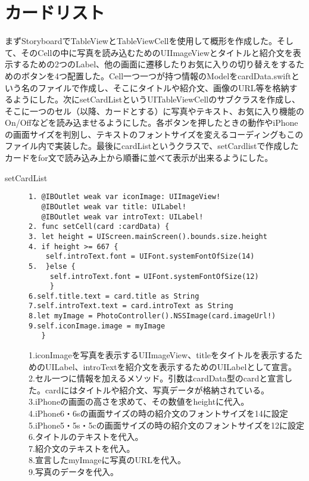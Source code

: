 \section{カードリスト}
まずStoryboardでTableViewとTableViewCellを使用して概形を作成した。そして、そのCellの中に写真を読み込むためのUIImageViewとタイトルと紹介文を表示するための2つのLabel、他の画面に遷移したりお気に入りの切り替えをするためのボタンを4つ配置した。Cell一つ一つが持つ情報のModelをcardData.swiftという名のファイルで作成し、そこにタイトルや紹介文、画像のURL等を格納するようにした。次にsetCardListというUITableViewCellのサブクラスを作成し、そこに一つのセル（以降、カードとする）に写真やテキスト、お気に入り機能のOn/Offなどを読み込ませるようにした。各ボタンを押したときの動作やiPhoneの画面サイズを判別し、テキストのフォントサイズを変えるコーディングもこのファイル内で実装した。最後にcardListというクラスで、setCardlistで作成したカードをfor文で読み込み上から順番に並べて表示が出来るようにした。

\begin{description}
\item[setCardList]\mbox{} 
\begin{lstlisting}[basicstyle=\ttfamily\footnotesize, frame=single]
1. @IBOutlet weak var iconImage: UIImageView!
   @IBOutlet weak var title: UILabel!
   @IBOutlet weak var introText: UILabel!
2. func setCell(card :cardData) {
3. let height = UIScreen.mainScreen().bounds.size.height
4. if height >= 667 {
    self.introText.font = UIFont.systemFontOfSize(14)
5.  }else {
     self.introText.font = UIFont.systemFontOfSize(12)
     }
6.self.title.text = card.title as String
7.self.introText.text = card.introText as String
8.let myImage = PhotoController().NSSImage(card.imageUrl!)
9.self.iconImage.image = myImage
   }
 \end{lstlisting}

1.iconImageを写真を表示するUIImageView、titleをタイトルを表示するためのUILabel、introTextを紹介文を表示するためのUILabelとして宣言。\\
2.セル一つに情報を加えるメソッド。引数はcardData型のcardと宣言した。cardにはタイトルや紹介文、写真データが格納されている。\\
3.iPhoneの画面の高さを求めて、その数値をheightに代入。\\
4.iPhone6・6sの画面サイズの時の紹介文のフォントサイズを14に設定 \\
5.iPhone5・5s・5cの画面サイズの時の紹介文のフォントサイズを12に設定 \\
6.タイトルのテキストを代入。 \\
7.紹介文のテキストを代入。 \\
8.宣言したmyImageに写真のURLを代入。 \\
9.写真のデータを代入。 \\
\end{description}

